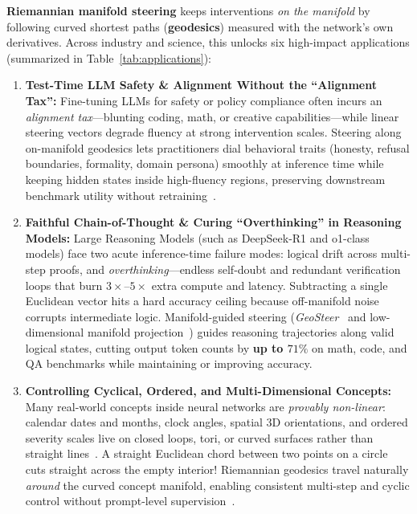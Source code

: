 \documentclass[11pt,a4paper]{article}
\theoremstyle{definition}
\begin{document}
\textbf{Riemannian manifold steering} keeps interventions \emph{on the manifold} by following curved shortest paths (\textbf{geodesics}) measured with the network's own derivatives. Across industry and science, this unlocks six high-impact applications (summarized in Table~\ref{tab:applications}):

\begin{enumerate}[leftmargin=*]
    \item \textbf{Test-Time LLM Safety \& Alignment Without the ``Alignment Tax'':}
    Fine-tuning LLMs for safety or policy compliance often incurs an \emph{alignment tax}---blunting coding, math, or creative capabilities---while linear steering vectors degrade fluency at strong intervention scales. Steering along on-manifold geodesics lets practitioners dial behavioral traits (honesty, refusal boundaries, formality, domain persona) smoothly at inference time while keeping hidden states inside high-fluency regions, preserving downstream benchmark utility without retraining~\cite{wurgaft2026manifold,oozeer2026riemannian}.

    \item \textbf{Faithful Chain-of-Thought \& Curing ``Overthinking'' in Reasoning Models:}
    Large Reasoning Models (such as DeepSeek-R1 and o1-class models) face two acute inference-time failure modes: logical drift across multi-step proofs, and \emph{overthinking}---endless self-doubt and redundant verification loops that burn $3\times$--$5\times$ extra compute and latency. Subtracting a single Euclidean vector hits a hard accuracy ceiling because off-manifold noise corrupts intermediate logic. Manifold-guided steering (\emph{GeoSteer}~\cite{kazama2026geosteer} and low-dimensional manifold projection~\cite{huang2025overthinking}) guides reasoning trajectories along valid logical states, cutting output token counts by \textbf{up to $71\%$} on math, code, and QA benchmarks while maintaining or improving accuracy.

    \item \textbf{Controlling Cyclical, Ordered, and Multi-Dimensional Concepts:}
    Many real-world concepts inside neural networks are \emph{provably non-linear}: calendar dates and months, clock angles, spatial 3D orientations, and ordered severity scales live on closed loops, tori, or curved surfaces rather than straight lines~\cite{engels2024nonlinear}. A straight Euclidean chord between two points on a circle cuts straight across the empty interior! Riemannian geodesics travel naturally \emph{around} the curved concept manifold, enabling consistent multi-step and cyclic control without prompt-level supervision~\cite{oozeer2026riemannian}.


\end{enumerate}
\end{document}
